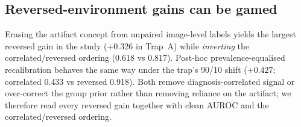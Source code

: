 \subsection{Reversed-environment gains can be gamed}
Erasing the artifact concept from unpaired image-level labels yields the largest reversed gain in the study
($+0.326$ in Trap~A) while \emph{inverting} the correlated/reversed ordering (0.618 vs 0.817). Post-hoc
prevalence-equalised recalibration \citep{kina2026prevalence} behaves the same way under the trap's 90/10 shift
($+0.427$; correlated 0.433 vs reversed 0.918). Both remove diagnosis-correlated signal or over-correct the
group prior rather than removing reliance on the artifact; we therefore read every reversed gain together with
clean AUROC and the correlated/reversed ordering.
